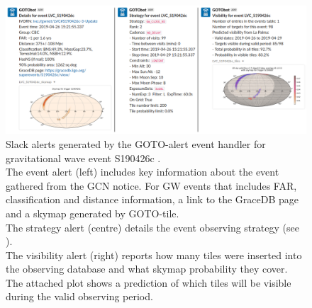 \begin{colsection}
\begin{colsection}
\begin{figure}
    \begin{center}
        \includegraphics[width=\linewidth]{images/slack_alert_side2.png}
    \end{center}
    \caption[Slack alerts created by GOTO-alert for a GW event]{
        Slack alerts generated by the GOTO-alert event handler for gravitational wave event S190426c .\\
        The event alert (left) includes key information about the event gathered from the GCN notice. For GW events that includes FAR, classification and distance information, a link to the GraceDB page and a skymap generated by GOTO-tile.\\
        The strategy alert (centre) details the event observing strategy (see ).\\
        The visibility alert (right) reports how many tiles were inserted into the observing database and what skymap probability they cover. The attached plot shows a prediction of which tiles will be visible during the valid observing period.
    }\label{fig:gotoalert_slack}
\end{figure}

\end{colsection}


\end{colsection}


\newpage
